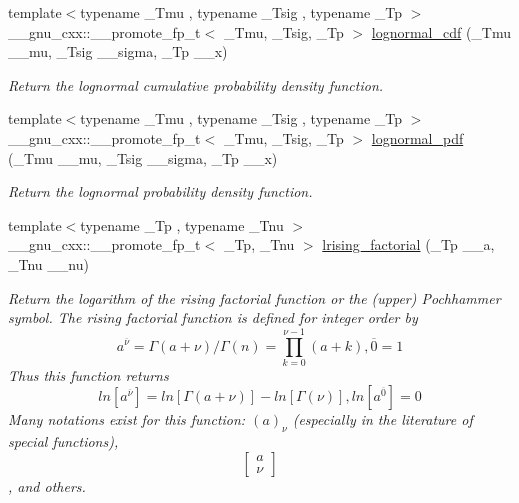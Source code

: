 \begin{DoxyCompactItemize}
{\footnotesize template$<$typename \+\_\+\+Tmu , typename \+\_\+\+Tsig , typename \+\_\+\+Tp $>$ }\\\+\_\+\+\_\+gnu\+\_\+cxx\+::\+\_\+\+\_\+promote\+\_\+fp\+\_\+t$<$ \+\_\+\+Tmu, \+\_\+\+Tsig, \+\_\+\+Tp $>$ \hyperlink{group__gnu__math__spec__func_gafa67c235e52c647104b9b439d828390b}{lognormal\+\_\+cdf} (\+\_\+\+Tmu \+\_\+\+\_\+mu, \+\_\+\+Tsig \+\_\+\+\_\+sigma, \+\_\+\+Tp \+\_\+\+\_\+x)
\begin{DoxyCompactList}\small\item\em Return the lognormal cumulative probability density function. \end{DoxyCompactList}\item 
{\footnotesize template$<$typename \+\_\+\+Tmu , typename \+\_\+\+Tsig , typename \+\_\+\+Tp $>$ }\\\+\_\+\+\_\+gnu\+\_\+cxx\+::\+\_\+\+\_\+promote\+\_\+fp\+\_\+t$<$ \+\_\+\+Tmu, \+\_\+\+Tsig, \+\_\+\+Tp $>$ \hyperlink{group__gnu__math__spec__func_ga32c31df3d88526cf991a045f85d73c00}{lognormal\+\_\+pdf} (\+\_\+\+Tmu \+\_\+\+\_\+mu, \+\_\+\+Tsig \+\_\+\+\_\+sigma, \+\_\+\+Tp \+\_\+\+\_\+x)
\begin{DoxyCompactList}\small\item\em Return the lognormal probability density function. \end{DoxyCompactList}\item 
{\footnotesize template$<$typename \+\_\+\+Tp , typename \+\_\+\+Tnu $>$ }\\\+\_\+\+\_\+gnu\+\_\+cxx\+::\+\_\+\+\_\+promote\+\_\+fp\+\_\+t$<$ \+\_\+\+Tp, \+\_\+\+Tnu $>$ \hyperlink{group__gnu__math__spec__func_ga86158caf7d3e8b439599a12953af9844}{lrising\+\_\+factorial} (\+\_\+\+Tp \+\_\+\+\_\+a, \+\_\+\+Tnu \+\_\+\+\_\+nu)
\begin{DoxyCompactList}\small\item\em Return the logarithm of the rising factorial function or the (upper) Pochhammer symbol. The rising factorial function is defined for integer order by \[ a^{\overline{\nu}} = \Gamma(a + \nu) / \Gamma(n) = \prod_{k=0}^{\nu-1} (a + k), \overline{0} = 1 \] Thus this function returns \[ ln[a^{\overline{\nu}}] = ln[\Gamma(a + \nu)] - ln[\Gamma(\nu)], ln[a^{\overline{0}}] = 0 \] Many notations exist for this function\+: $ (a)_\nu $ (especially in the literature of special functions), \[ \left[ \begin{array}{c} a \\ \nu \end{array} \right] \], and others. \end{DoxyCompactList}\item 

\end{DoxyCompactItemize}
